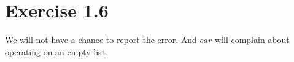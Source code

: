 \section*{Exercise 1.6}

We will not have a chance to report the error.
And $car$ will complain about operating on an empty list.
